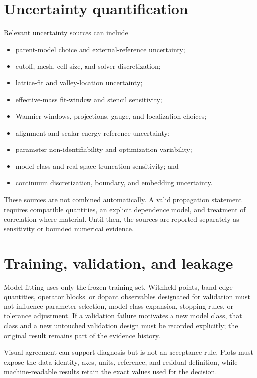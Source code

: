 \section{Uncertainty quantification}

Relevant uncertainty sources can include

\begin{itemize}
  \item parent-model choice and external-reference uncertainty;
  \item cutoff, mesh, cell-size, and solver discretization;
  \item lattice-fit and valley-location uncertainty;
  \item effective-mass fit-window and stencil sensitivity;
  \item Wannier windows, projections, gauge, and localization choices;
  \item alignment and scalar energy-reference uncertainty;
  \item parameter non-identifiability and optimization variability;
  \item model-class and real-space truncation sensitivity; and
  \item continuum discretization, boundary, and embedding uncertainty.
\end{itemize}

These sources are not combined automatically. A valid propagation statement
requires compatible quantities, an explicit dependence model, and treatment of
correlation where material. Until then, the sources are reported separately as
sensitivity or bounded numerical evidence.

\section{Training, validation, and leakage}

Model fitting uses only the frozen training set. Withheld points, band-edge
quantities, operator blocks, or dopant observables designated for validation
must not influence parameter selection, model-class expansion, stopping rules,
or tolerance adjustment. If a validation failure motivates a new model class,
that class and a new untouched validation design must be recorded explicitly;
the original result remains part of the evidence history.

Visual agreement can support diagnosis but is not an acceptance rule. Plots
must expose the data identity, axes, units, reference, and residual definition,
while machine-readable results retain the exact values used for the decision.


